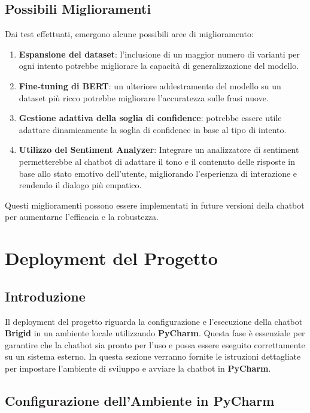 \documentclass[12pt, letterpaper]{article}
\begin{document}
\subsection{Possibili Miglioramenti}

Dai test effettuati, emergono alcune possibili aree di miglioramento:
\begin{enumerate}
	\item \textbf{Espansione del dataset}: l’inclusione di un maggior numero di varianti per ogni intento potrebbe migliorare la capacità di generalizzazione del modello.
	\item \textbf{Fine-tuning di BERT}: un ulteriore addestramento del modello su un dataset più ricco potrebbe migliorare l’accuratezza sulle frasi nuove.
	\item \textbf{Gestione adattiva della soglia di confidence}: potrebbe essere utile adattare dinamicamente la soglia di confidence in base al tipo di intento.
	\item \textbf{Utilizzo del Sentiment Analyzer}: Integrare un analizzatore di sentiment permetterebbe al chatbot di adattare il tono e il contenuto delle risposte in base allo stato emotivo dell’utente, migliorando l’esperienza di interazione e rendendo il dialogo più empatico.
\end{enumerate}
Questi miglioramenti possono essere implementati in future versioni della chatbot per aumentarne l’efficacia e la robustezza.
\newpage
\section{Deployment del Progetto}

\subsection{Introduzione}
Il deployment del progetto riguarda la configurazione e l'esecuzione della chatbot \textbf{Brigid} in un ambiente locale utilizzando \textbf{PyCharm}. Questa fase è essenziale per garantire che la chatbot sia pronto per l'uso e possa essere eseguito correttamente su un sistema esterno.
In questa sezione verranno fornite le istruzioni dettagliate per impostare l'ambiente di sviluppo e avviare la chatbot in \textbf{PyCharm}.

\subsection{Configurazione dell'Ambiente in PyCharm}
\end{document}
